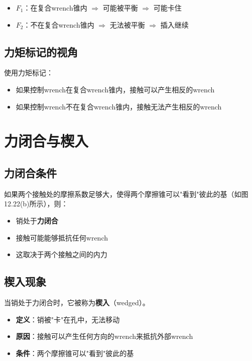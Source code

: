 \documentclass[12pt,a4paper]{article}
\begin{document}
\begin{itemize}
    \item \textbf{$F_1$}：在复合wrench锥内 $\Rightarrow$ 可能被平衡 $\Rightarrow$ 可能卡住
    \item \textbf{$F_2$}：不在复合wrench锥内 $\Rightarrow$ 无法被平衡 $\Rightarrow$ 插入继续
\end{itemize}

\subsection{力矩标记的视角}

使用力矩标记：
\begin{itemize}
    \item 如果控制wrench在复合wrench锥内，接触可以产生相反的wrench
    \item 如果控制wrench不在复合wrench锥内，接触无法产生相反的wrench
\end{itemize}

\section{力闭合与楔入}

\subsection{力闭合条件}

如果两个接触处的摩擦系数足够大，使得两个摩擦锥可以"看到"彼此的基（如图12.22(b)所示），则：

\begin{itemize}
    \item 销处于\textbf{力闭合}
    \item 接触可能能够抵抗任何wrench
    \item 这取决于两个接触之间的内力
\end{itemize}

\subsection{楔入现象}

当销处于力闭合时，它被称为\textbf{楔入}（wedged）。

\begin{itemize}
    \item \textbf{定义}：销被"卡"在孔中，无法移动
    \item \textbf{原因}：接触可以产生任何方向的wrench来抵抗外部wrench
    \item \textbf{条件}：两个摩擦锥可以"看到"彼此的基
\end{itemize}
\end{document}
